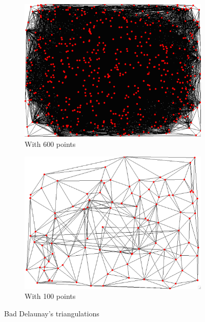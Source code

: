 \documentclass[a4paper,11pt]{article}%
\begin{document}
\begin{figure}[H]
	\centering
	\begin{subfigure}{.5\textwidth}
		\begin{center}
			\includegraphics[width=0.99\linewidth]{convexhull-messedup.png}
		\end{center}
		\caption{With 600 points}
		\label{fig:verymessedup}
	\end{subfigure}%
	\begin{subfigure}{.5\textwidth}
		\begin{center}
			\includegraphics[width=0.99\linewidth]{convexhull-messedup-abit.png}
		\end{center}
		\caption{With 100 points}
		\label{fig:messedupabit}
	\end{subfigure}
	\caption{Bad Delaunay's triangulations}
	\label{fig:messedup}
\end{figure}
\end{document}
